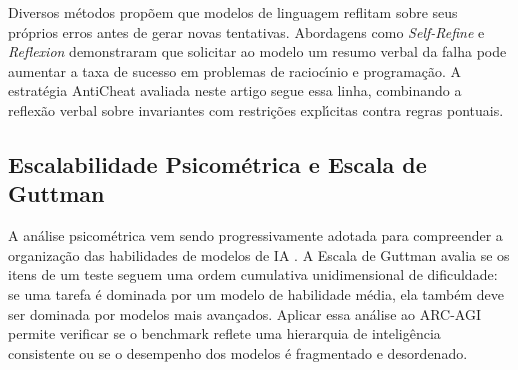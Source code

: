 Diversos m\'{e}todos prop\~{o}em que modelos de linguagem reflitam sobre seus pr\'{o}prios erros antes de gerar novas tentativas. Abordagens como \textit{Self-Refine} \cite{madaan2023self} e \textit{Reflexion} \cite{shinn2023reflexion} demonstraram que solicitar ao modelo um resumo verbal da falha pode aumentar a taxa de sucesso em problemas de racioc\'{\i}nio e programa\c{c}\~{a}o. A estrat\'{e}gia AntiCheat avaliada neste artigo segue essa linha, combinando a reflex\~{a}o verbal sobre invariantes com restri\c{c}\~{o}es expl\'{\i}citas contra regras pontuais.

\subsection{Escalabilidade Psicom\'{e}trica e Escala de Guttman}

A an\'{a}lise psicom\'{e}trica vem sendo progressivamente adotada para compreender a organiza\c{c}\~{a}o das habilidades de modelos de IA \cite{guttman1944basis}. A Escala de Guttman avalia se os itens de um teste seguem uma ordem cumulativa unidimensional de dificuldade: se uma tarefa \'{e} dominada por um modelo de habilidade m\'{e}dia, ela tamb\'{e}m deve ser dominada por modelos mais avan\c{c}ados. Aplicar essa an\'{a}lise ao ARC-AGI permite verificar se o benchmark reflete uma hierarquia de intelig\^{e}ncia consistente ou se o desempenho dos modelos \'{e} fragmentado e desordenado.

